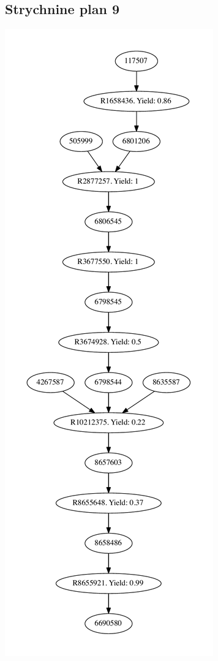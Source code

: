 \documentclass[a4paper,10pt,titlepage]{paper}
\begin{document}
\subsection{Strychnine plan 9}
\centering
\includegraphics[scale=0.4]{Synteseplaner/Strychnine/plan9.pdf}
\label{Appendix::Strychnine9}
\end{document}
